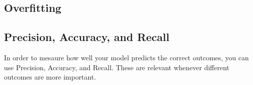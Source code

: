 \documentclass{article}
\begin{document}
	\subsection{Overfitting}
	\subsection{Precision, Accuracy, and Recall}
	In order to mesaure how well your model predicts the correct outcomes, you can use Precision, Accuracy, and Recall. These are relevant whenever different outcomes are more important.
	























  
\end{document}
